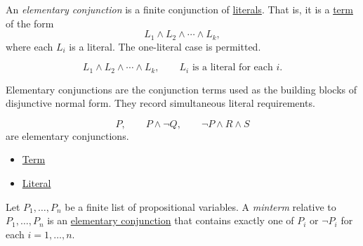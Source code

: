 \begin{tcolorbox}[colback=propbox, colframe=propborder, arc=2pt, left=6pt, right=6pt, top=4pt, bottom=4pt, title={\small\textbf{Definition (Elementary Conjunction)}}]
\begin{definition}
\label{def:elementary-conjunction-propositional-logic}
An \emph{elementary conjunction} is a finite conjunction of
\hyperref[def:literal-propositional-logic]{literals}. That is, it is a
\hyperref[def:term-propositional-logic]{term} of the form
\[
L_1\land L_2\land\cdots\land L_k,
\]
where each \(L_i\) is a literal. The one-literal case is permitted.
\end{definition}
\end{tcolorbox}

\begin{remark*}
\[
L_1\land L_2\land\cdots\land L_k,
\qquad
L_i\text{ is a literal for each }i.
\]
\end{remark*}

\begin{remark*}[Interpretation]
Elementary conjunctions are the conjunction terms used as the building blocks
of disjunctive normal form. They record simultaneous literal requirements.
\end{remark*}

\begin{example*}[Examples]
\[
P,\qquad P\land\neg Q,\qquad \neg P\land R\land S
\]
are elementary conjunctions.
\end{example*}

\begin{dependencies}
\begin{itemize}
  \item \hyperref[def:term-propositional-logic]{Term}
  \item \hyperref[def:literal-propositional-logic]{Literal}
\end{itemize}
\end{dependencies}

\begin{tcolorbox}[colback=propbox, colframe=propborder, arc=2pt, left=6pt, right=6pt, top=4pt, bottom=4pt, title={\small\textbf{Definition (Minterm)}}]
\begin{definition}[Minterm]
\label{def:minterm-propositional-logic}
Let \(P_1,\ldots,P_n\) be a finite list of propositional variables. A
\emph{minterm} relative to \(P_1,\ldots,P_n\) is an
\hyperref[def:elementary-conjunction-propositional-logic]{elementary conjunction}
that contains exactly one of \(P_i\) or \(\neg P_i\) for each
\(i=1,\ldots,n\).
\end{definition}
\end{tcolorbox}

